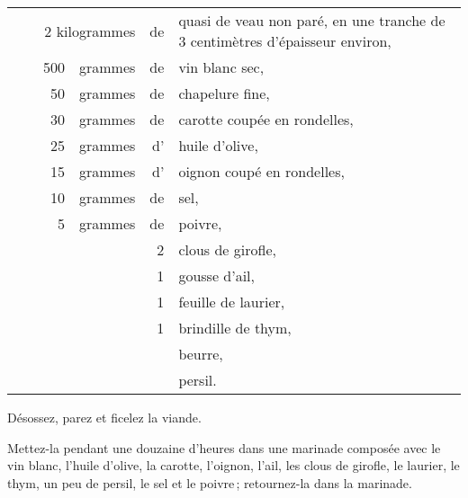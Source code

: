 \footnotesize
\begin{longtable}{rp{2em}rrrp{16em}}
& \multicolumn{3}{r}{2 kilogrammes} & de & quasi de veau non paré, en une tranche de
                                             3 centimètres d'épaisseur environ,                           \\
& &   500 & grammes & de & vin blanc sec,                                                                 \\
& &    50 & grammes & de & chapelure fine,                                                                \\
& &    30 & grammes & de & carotte coupée en rondelles,                                                   \\
& &    25 & grammes & d' & huile d'olive,                                                                 \\
& &    15 & grammes & d' & oignon coupé en rondelles,                                                     \\
& &    10 & grammes & de & sel,                                                                           \\
& &     5 & grammes & de & poivre,                                                                        \\
& &       &         &  2 & clous de girofle,                                                              \\
& &       &         &  1 & gousse d'ail,                                                                  \\
& &       &         &  1 & feuille de laurier,                                                            \\
& &       &         &  1 & brindille de thym,                                                             \\
& &       &         &    & beurre,                                                                        \\
& &       &         &    & persil.                                                                        \\
\end{longtable}
\normalsize

Désossez, parez et ficelez la viande.

Mettez-la pendant une douzaine d'heures dans une marinade composée avec le vin
blanc, l'huile d'olive, la carotte, l'oignon, l'ail, les clous de girofle, le
laurier, le thym, un peu de persil, le sel et le poivre ; retournez-la dans la
marinade.

